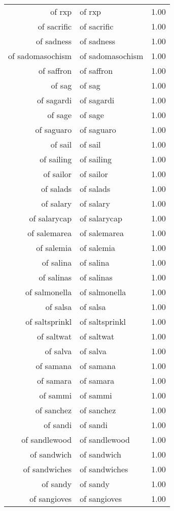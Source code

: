 \begin{table}[ht]
\begin{tabular}{rlr}
  of rxp & of rxp & 1.00 \\ 
  of sacrific & of sacrific & 1.00 \\ 
  of sadness & of sadness & 1.00 \\ 
  of sadomasochism & of sadomasochism & 1.00 \\ 
  of saffron & of saffron & 1.00 \\ 
  of sag & of sag & 1.00 \\ 
  of sagardi & of sagardi & 1.00 \\ 
  of sage & of sage & 1.00 \\ 
  of saguaro & of saguaro & 1.00 \\ 
  of sail & of sail & 1.00 \\ 
  of sailing & of sailing & 1.00 \\ 
  of sailor & of sailor & 1.00 \\ 
  of salads & of salads & 1.00 \\ 
  of salary & of salary & 1.00 \\ 
  of salarycap & of salarycap & 1.00 \\ 
  of salemarea & of salemarea & 1.00 \\ 
  of salemia & of salemia & 1.00 \\ 
  of salina & of salina & 1.00 \\ 
  of salinas & of salinas & 1.00 \\ 
  of salmonella & of salmonella & 1.00 \\ 
  of salsa & of salsa & 1.00 \\ 
  of saltsprinkl & of saltsprinkl & 1.00 \\ 
  of saltwat & of saltwat & 1.00 \\ 
  of salva & of salva & 1.00 \\ 
  of samana & of samana & 1.00 \\ 
  of samara & of samara & 1.00 \\ 
  of sammi & of sammi & 1.00 \\ 
  of sanchez & of sanchez & 1.00 \\ 
  of sandi & of sandi & 1.00 \\ 
  of sandlewood & of sandlewood & 1.00 \\ 
  of sandwich & of sandwich & 1.00 \\ 
  of sandwiches & of sandwiches & 1.00 \\ 
  of sandy & of sandy & 1.00 \\ 
  of sangioves & of sangioves & 1.00 \\ 

\end{tabular}
\end{table}

